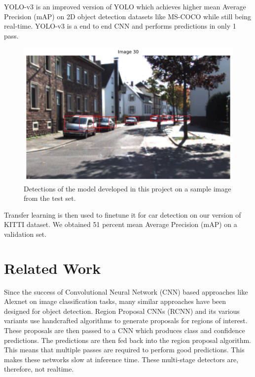 \documentclass[10pt,twocolumn,letterpaper]{article}
\begin{document}
YOLO-v3 is an improved version of YOLO \cite{redmon2016yolov1} which achieves 
higher mean Average Precision (mAP) on 2D object detection datasets like MS-COCO \cite{mscoco} while still being real-time. YOLO-v3 is a end to end CNN and performs predictions in only 1 pass.  

\begin{figure}[t]
	\begin{center}
		\includegraphics[width=1.0\linewidth]{figure30.png}
	\end{center}
	\caption{Detections of the model developed in this project on a sample image from the test set.}
	\label{fig:pred_example_plot}
\end{figure}

Transfer learning is then used to finetune it for car detection on our version of KITTI dataset. We obtained 51 percent mean Average Precision (mAP) on a validation set.
\section{Related Work}
Since the success of Convolutional Neural Network (CNN) based approaches like Alexnet \cite{Alexnet} on image classification tasks, many similar approaches have been designed for object detection. Region Proposal CNNs (RCNN) \cite{ren2015faster} and its various variants use handcrafted algorithms to generate proposals for regions of interest. These proposals are then passed to a CNN which produces class and confidence predictions. The predictions are then fed back into the region proposal algorithm. This means that multiple passes are required to perform good predictions. This makes these networks slow at inference time. These multi-stage detectors are, therefore, not realtime. 
\end{document}
